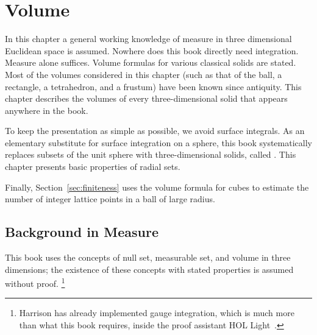 


\chapter{Volume}\label{chapter:volume}

\begin{summary}
  In this chapter a general working knowledge of measure in three
  dimensional Euclidean space is assumed.  Nowhere does this book directly need
   integration.  Measure alone suffices.  Volume formulas
  for various classical solids are stated.  Most of the volumes
  considered in this chapter (such as that of the ball, a rectangle, a
  tetrahedron, and a frustum) have been known since antiquity.  This chapter
  describes the volumes of every
  three-dimensional solid that appears anywhere in the book.

  To keep the presentation as simple as possible,  we avoid surface integrals.
  As an elementary substitute for surface
  integration on a sphere, this book systematically replaces
  subsets of the unit sphere with three-dimensional solids, called .  This chapter presents basic properties of radial sets.

  Finally, Section~\ref{sec:finiteness} uses the volume formula for cubes to estimate the number
  of integer lattice points in a ball of large radius.
\end{summary}

\section{Background in Measure}
%


This book uses the concepts of null set, measurable set, and volume in
three dimensions; the existence of these concepts with
stated properties is assumed without proof. \footnote{Harrison has already implemented gauge integration, which is much
more than what this book requires, inside the proof assistant HOL
Light~\cite{HHMNOZ}.}




